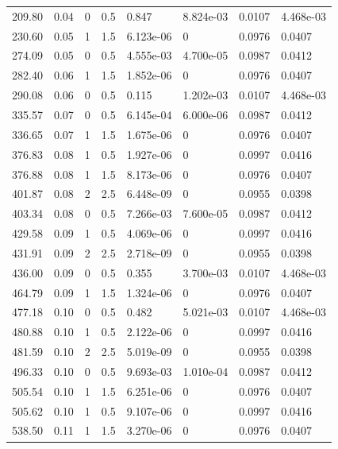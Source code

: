 \documentclass[preview]{standalone}
\begin{document}
{{\begin{tabular}{L{1.2cm}C{1.2cm} C{0.3cm}C{0.5cm} C{1.4cm}C{1.4cm} C{1.4cm}C{1.4cm}}
  209.80  &  0.04  & 0     & 0.5 &  0.847  & 8.824e-03  & 0.0107 &  4.468e-03   \\ 
  230.60  &  0.05  & 1     & 1.5 &  6.123e-06  & 0  & 0.0976 &  0.0407   \\ 
  274.09  &  0.05  & 0     & 0.5 &  4.555e-03  & 4.700e-05  & 0.0987 &  0.0412   \\ 
  282.40  &  0.06  & 1     & 1.5 &  1.852e-06  & 0  & 0.0976 &  0.0407   \\ 
  290.08  &  0.06  & 0     & 0.5 &  0.115  & 1.202e-03  & 0.0107 &  4.468e-03   \\ 
  335.57  &  0.07  & 0     & 0.5 &  6.145e-04  & 6.000e-06  & 0.0987 &  0.0412   \\ 
  336.65  &  0.07  & 1     & 1.5 &  1.675e-06  & 0  & 0.0976 &  0.0407   \\ 
  376.83  &  0.08  & 1     & 0.5 &  1.927e-06  & 0  & 0.0997 &  0.0416   \\ 
  376.88  &  0.08  & 1     & 1.5 &  8.173e-06  & 0  & 0.0976 &  0.0407   \\ 
  401.87  &  0.08  & 2     & 2.5 &  6.448e-09  & 0  & 0.0955 &  0.0398   \\ 
  403.34  &  0.08  & 0     & 0.5 &  7.266e-03  & 7.600e-05  & 0.0987 &  0.0412   \\ 
  429.58  &  0.09  & 1     & 0.5 &  4.069e-06  & 0  & 0.0997 &  0.0416   \\ 
  431.91  &  0.09  & 2     & 2.5 &  2.718e-09  & 0  & 0.0955 &  0.0398   \\ 
  436.00  &  0.09  & 0     & 0.5 &  0.355  & 3.700e-03  & 0.0107 &  4.468e-03   \\ 
  464.79  &  0.09  & 1     & 1.5 &  1.324e-06  & 0  & 0.0976 &  0.0407   \\ 
  477.18  &  0.10  & 0     & 0.5 &  0.482  & 5.021e-03  & 0.0107 &  4.468e-03   \\ 
  480.88  &  0.10  & 1     & 0.5 &  2.122e-06  & 0  & 0.0997 &  0.0416   \\ 
  481.59  &  0.10  & 2     & 2.5 &  5.019e-09  & 0  & 0.0955 &  0.0398   \\ 
  496.33  &  0.10  & 0     & 0.5 &  9.693e-03  & 1.010e-04  & 0.0987 &  0.0412   \\ 
  505.54  &  0.10  & 1     & 1.5 &  6.251e-06  & 0  & 0.0976 &  0.0407   \\ 
  505.62  &  0.10  & 1     & 0.5 &  9.107e-06  & 0  & 0.0997 &  0.0416   \\ 
  538.50  &  0.11  & 1     & 1.5 &  3.270e-06  & 0  & 0.0976 &  0.0407   \\ 

\end{tabular}}}
\end{document}
